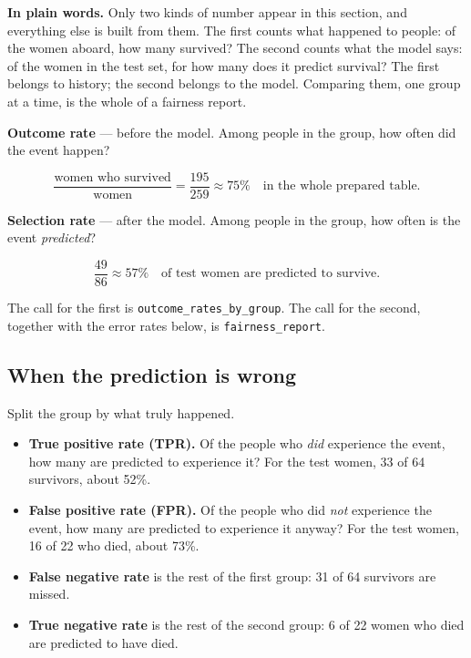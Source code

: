 \documentclass[11pt]{article}
\newcommand{\fn}[1]{\texttt{\small #1}}
\newcommand{\pct}[1]{\mbox{#1\%}}
\begin{document}
\begin{plainwords}
\textbf{In plain words.} Only two kinds of number appear in this section, and everything else is built from them. The first counts what happened to people: of the women aboard, how many survived? The second counts what the model says: of the women in the test set, for how many does it predict survival? The first belongs to history; the second belongs to the model. Comparing them, one group at a time, is the whole of a fairness report.
\end{plainwords}

\begin{idea}
\textbf{Outcome rate} --- before the model. Among people in the group, how often did the event happen?

\[
\frac{\text{women who survived}}{\text{women}} = \frac{195}{259} \approx \pct{75}
\quad\text{in the whole prepared table.}
\]

\textbf{Selection rate} --- after the model. Among people in the group, how often is the event \emph{predicted}?

\[
\frac{49}{86} \approx \pct{57}
\quad\text{of test women are predicted to survive.}
\]

The call for the first is \fn{outcome\_rates\_by\_group}. The call for the second, together with the error rates below, is \fn{fairness\_report}.
\end{idea}

\subsection{When the prediction is wrong}

Split the group by what truly happened.

\begin{itemize}
  \item \textbf{True positive rate (TPR).} Of the people who \emph{did} experience the event, how many are predicted to experience it? For the test women, 33 of 64 survivors, about \pct{52}.
  \item \textbf{False positive rate (FPR).} Of the people who did \emph{not} experience the event, how many are predicted to experience it anyway? For the test women, 16 of 22 who died, about \pct{73}.
  \item \textbf{False negative rate} is the rest of the first group: 31 of 64 survivors are missed.
  \item \textbf{True negative rate} is the rest of the second group: 6 of 22 women who died are predicted to have died.
\end{itemize}
\end{document}
